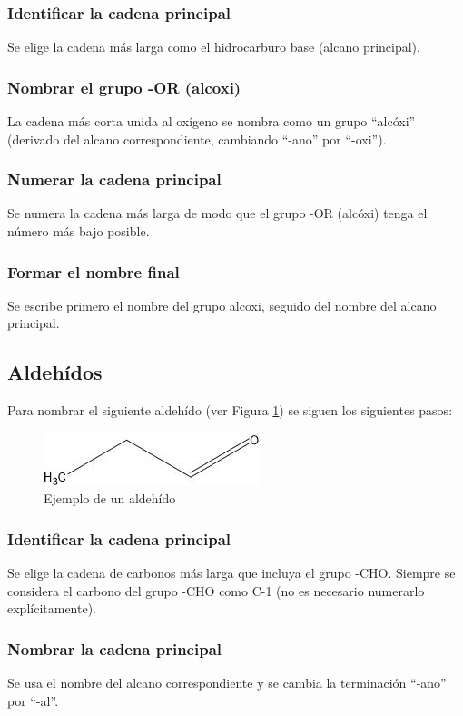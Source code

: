 \documentclass{article}
\begin{document}
\subsubsection{Identificar la cadena principal}
Se elige la cadena más larga como el hidrocarburo base (alcano principal).

\subsubsection{Nombrar el grupo -OR (alcoxi)}
La cadena más corta unida al oxígeno se nombra como un grupo ``alcóxi'' (derivado del alcano correspondiente, cambiando ``-ano'' por ``-oxi'').

\subsubsection{Numerar la cadena principal}
Se numera la cadena más larga de modo que el grupo -OR (alcóxi) tenga el número más bajo posible.

\subsubsection{Formar el nombre final}
Se escribe primero el nombre del grupo alcoxi, seguido del nombre del alcano principal.

\subsection{Aldehídos}
Para nombrar el siguiente aldehído (ver Figura \ref{fig:aldehido}) se siguen los siguientes pasos:
\begin{figure}[h]
    \centering
    \includegraphics[width=0.5\linewidth]{media/propanal.jpg}
    \caption{Ejemplo de un aldehído}
    \label{fig:aldehido}
\end{figure}

\subsubsection{Identificar la cadena principal}
Se elige la cadena de carbonos más larga que incluya el grupo -CHO. Siempre se considera el carbono del grupo -CHO como C-1 (no es necesario numerarlo explícitamente).

\subsubsection{Nombrar la cadena principal}
Se usa el nombre del alcano correspondiente y se cambia la terminación ``-ano'' por ``-al''.
\end{document}
